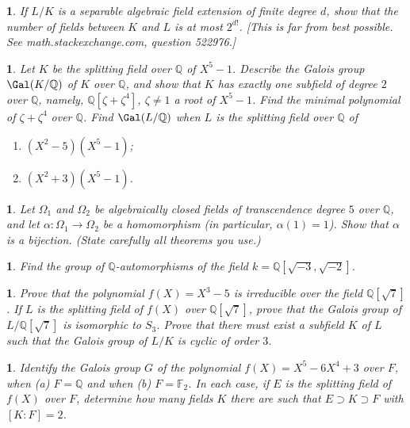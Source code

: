 \documentclass[a4paper,11pt,final,openany]{memoir}
\newtheorem{exercise}[Y]{}
\theoremstyle{nonumberplain}
\begin{document}
\begin{exercise}
\label{x53} If $L/K$ is a separable algebraic field extension of finite degree
$d$, show that the number of fields between $K$ and $L$ is at most $2^{d!}$.
[This is far from best possible. See math.stackexchange.com, question 522976.]
\end{exercise}

\begin{exercise}
\label{x54} Let $K$ be the splitting field over ${\mathbb{Q}}$ of $X^{5}-1$.
Describe the Galois group $\Gal(K/{\mathbb{Q}})$ of $K$ over ${\mathbb{Q}}$,
and show that $K$ has exactly one subfield of degree $2$ over ${\mathbb{Q}}$,
namely, ${\mathbb{Q}}[\zeta+\zeta^{4}]$, $\zeta\neq1$ a root of $X^{5}-1$.
Find the minimal polynomial of $\zeta+\zeta^{4}$ over ${\mathbb{Q}}$. Find
$\Gal(L/{\mathbb{Q}})$ when $L$ is the splitting field over ${\mathbb{Q}}$ of

\begin{enumerate}
\item $(X^{2}-5)(X^{5}-1)$;

\item $(X^{2}+3)(X^{5}-1)$.
\end{enumerate}
\end{exercise}

\begin{exercise}
\label{x55} Let $\Omega_{1}$ and $\Omega_{2}$ be algebraically closed fields
of transcendence degree $5$ over ${\mathbb{Q}}$, and let $\alpha\colon
\Omega_{1}\rightarrow\Omega_{2}$ be a homomorphism (in particular,
$\alpha(1)=1$). Show that $\alpha$ is a bijection. (State carefully all
theorems you use.)
\end{exercise}

\begin{exercise}
\label{x56} Find the group of ${\mathbb{Q}}$-automorphisms of the field
$k={\mathbb{Q}}[\sqrt{-3},\sqrt{-2}]$.
\end{exercise}

\begin{exercise}
\label{x57} Prove that the polynomial $f(X)=X^{3}-5$ is irreducible over the
field ${\mathbb{Q}}[\sqrt7]$. If $L$ is the splitting field of $f(X)$ over
${\mathbb{Q}}[\sqrt7]$, prove that the Galois group of $L/{\mathbb{Q}}%
[\sqrt7]$ is isomorphic to $S_{3}$. Prove that there must exist a subfield $K$
of $L$ such that the Galois group of $L/K$ is cyclic of order $3$.
\end{exercise}

\begin{exercise}
\label{x58} Identify the Galois group $G$ of the polynomial $f(X)=X^{5}%
-6X^{4}+3$ over $F$, when (a) $F={\mathbb{Q}}$ and when (b) $F=\mathbb{F}_{2}%
$. In each case, if $E$ is the splitting field of $f(X)$ over $F$, determine
how many fields $K$ there are such that $E\supset K\supset F$ with $[K\colon
F]=2$.
\end{exercise}
\end{document}
